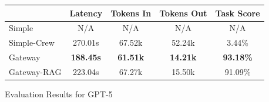 \begin{table}[ht]
\centering
\renewcommand{\arraystretch}{1.2}
\setlength{\tabcolsep}{7pt}

\begin{tabular}{lcccc}
\toprule    & Latency          & Tokens In       & Tokens Out      & Task Score \\
\midrule
Simple      & N/A              & N/A             & N/A             & N/A \\
Simple-Crew & 270.01s          & 67.52k          & 52.24k          & 3.44\% \\
Gateway     & \textbf{188.45s} & \textbf{61.51k} & \textbf{14.21k} & \textbf{93.18\%} \\
Gateway-RAG & 223.04s          & 67.27k          & 15.50k          & 91.09\% \\
\bottomrule
\end{tabular}
\label{fig:gpt-5}

\vspace{4pt}
\par\noindent\normalfont Evaluation Results for GPT-5\par
\end{table}
